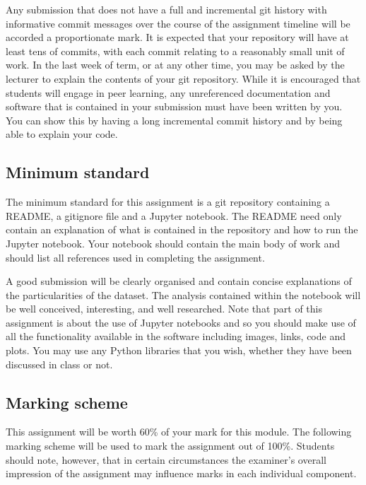 \documentclass[12pt, a4paper, hidelinks]{scrartcl}
\begin{document}
  Any submission that does not have a full and incremental git history with informative commit messages over the course of the assignment timeline will be accorded a proportionate mark.
  It is expected that your repository will have at least tens of commits, with each commit relating to a reasonably small unit of work.
  In the last week of term, or at any other time, you may be asked by the lecturer to explain the contents of your git repository.
  While it is encouraged that students will engage in peer learning, any unreferenced documentation and software that is contained in your submission must have been written by you.
  You can show this by having a long incremental commit history and by being able to explain your code.


\subsection*{Minimum standard}
  The minimum standard for this assignment is a git repository containing a README, a gitignore file and a Jupyter notebook.
  The README need only contain an explanation of what is contained in the repository and how to run the Jupyter notebook.
  Your notebook should contain the main body of work and should list all references used in completing the assignment.

  A good submission will be clearly organised and contain concise explanations of the particularities of the dataset.
  The analysis contained within the notebook will be well conceived, interesting, and well researched.
  Note that part of this assignment is about the use of Jupyter notebooks and so you should make use of all the functionality available in the software including images, links, code and plots.
  You may use any Python libraries that you wish, whether they have been discussed in class or not.


\subsection*{Marking scheme}
  This assignment will be worth 60\% of your mark for this module.
  The following marking scheme will be used to mark the assignment out of 100\%.
  Students should note, however, that in certain circumstances the examiner's overall impression of the assignment may influence marks in each individual component.
\end{document}
